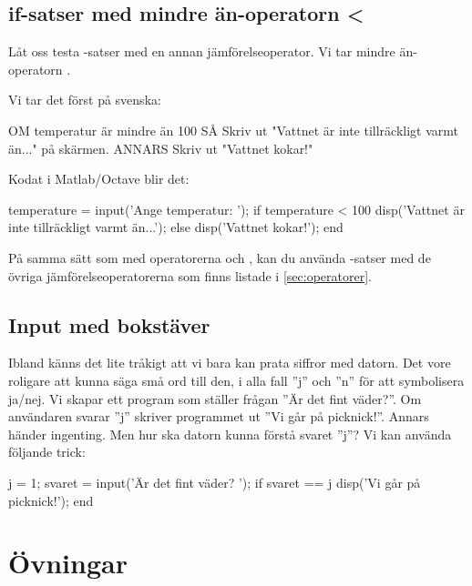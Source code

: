 \subsection{if-satser med mindre än-operatorn <}
Låt oss testa -satser med en annan jämförelseoperator. Vi tar mindre än-operatorn \cw{<}.

Vi tar det först på svenska:

\begin{pseudo}
OM temperatur är mindre än 100 SÅ
   Skriv ut "Vattnet är inte tillräckligt varmt än..." på skärmen.
ANNARS
   Skriv ut "Vattnet kokar!"
\end{pseudo}
\newpage
Kodat i Matlab/Octave blir det:

\begin{matlab}[caption={Mindre än-operatorn},label={}]
temperature = input('Ange temperatur: ');
if temperature < 100
    disp('Vattnet är inte tillräckligt varmt än...');
else
    disp('Vattnet kokar!');
end
\end{matlab}

På samma sätt som med operatorerna \cw{==} och \cw{<}, kan du använda -satser med de övriga jämförelseoperatorerna som finns listade i \autoref{sec:operatorer}.


\subsection{Input med bokstäver}

Ibland känns det lite tråkigt att vi bara kan prata siffror med datorn. Det vore roligare att kunna säga små ord till den, i alla fall ''j'' och ''n'' för att symbolisera ja/nej.
Vi skapar ett program som ställer frågan ''Är det fint väder?''. Om användaren svarar ''j'' skriver programmet ut ''Vi går på picknick!''. Annars händer ingenting. Men hur ska datorn kunna förstå svaret ''j''? Vi kan använda följande trick:

\begin{matlab}[caption={Kontrollera vädret},label={ml:kontrolleraVadret}]
j = 1; %
svaret = input('Är det fint väder? ');
if svaret == j
    disp('Vi går på picknick!');
end
\end{matlab}


\section{Övningar}

